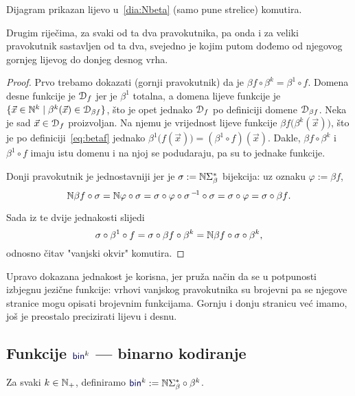 \begin{lema}[{name=[brojevni-jezični-brojevni dijagram komutira]}]\label{lm:pravkomut}
Dijagram prikazan lijevo u~\eqref{dia:Nbeta} (samo pune strelice) komutira.
\end{lema}
Drugim riječima, za svaki od ta dva pravokutnika, pa onda i za veliki pravokutnik sastavljen od ta dva, svejedno je kojim putom dođemo od njegovog gornjeg lijevog do donjeg desnog vrha.
\begin{proof}
Prvo trebamo dokazati (gornji pravokutnik) da je $\beta f\circ\beta^k =\beta^1\circ f$. Domena desne funkcije je $\mathcal D_{f}$ jer je $\beta^1$ totalna, a domena lijeve funkcije je $\{\vec x\in{\mathbb N}^k\mid\beta^k(\vec x)\in\mathcal D_{\beta f}\}$, što je opet jednako $\mathcal D_{f}$ po definiciji domene $\mathcal D_{\beta f}$. Neka je sad $\vec x\in\mathcal D_{f}$ proizvoljan. Na njemu je vrijednost lijeve funkcije $\beta f\bigl(\beta^k(\vec x)\bigr)$, što je po definiciji~\eqref{eq:betaf} jednako $\beta^1\bigl(f(\vec x)\bigr)=(\beta^1\circ f)(\vec x)$. Dakle, $\beta f\circ\beta^k$ i $\beta^1\circ f$ imaju istu domenu i na njoj se podudaraju, pa su to jednake funkcije.

Donji pravokutnik je jednostavniji jer je $\sigma:={\mathbb N}\Sigma_\beta^*$ bijekcija: uz oznaku $\varphi:=\beta f$,
\begin{equation}
    {\mathbb N}\beta f\circ\sigma={\mathbb N}\varphi\circ\sigma=\sigma\circ\varphi\circ\sigma^{\,-\!1}\circ\sigma=\sigma\circ\varphi=\sigma\circ\beta f\text.
\end{equation}

Sada iz te dvije jednakosti slijedi
\begin{equation}\label{eq:pravkomut}
    \sigma\circ\beta^1\circ f=\sigma\circ\beta f\circ\beta^k={\mathbb N}\beta f\circ\sigma\circ\beta^k\text,
\end{equation}
odnosno čitav "\!vanjski okvir" komutira.
\end{proof}

Upravo dokazana jednakost je korisna, jer pruža način da se u potpunosti izbjegnu jezične funkcije: vrhovi vanjskog pravokutnika su brojevni pa se njegove stranice mogu opisati brojevnim funkcijama. Gornju i donju stranicu već imamo, još je preostalo precizirati lijevu i desnu.

\subsection{Funkcije \texorpdfstring{$\f{bin}^k$}{bin} --- binarno kodiranje}

\begin{definicija}[{name=[binarno kodiranje --- prateća funkcija binarne reprezentacije]}]\label{def:bink}
Za svaki $k\in{\mathbb N}_+$, definiramo $\f{bin}^k:=\N\Sigma_\beta^*\circ\beta^k$.
\end{definicija}

